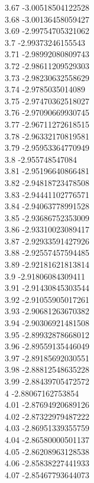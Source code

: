 {3.67	-3.00518504122528\\
3.68	-3.00136458059427\\
3.69	-2.99754705321062\\
3.7	-2.99373246155543\\
3.71	-2.98992080809743\\
3.72	-2.98611209529303\\
3.73	-2.98230632558629\\
3.74	-2.9785035014089\\
3.75	-2.97470362518027\\
3.76	-2.97090669930745\\
3.77	-2.96711272618515\\
3.78	-2.96332170819581\\
3.79	-2.95953364770949\\
3.8	-2.955748547084\\
3.81	-2.95196640866481\\
3.82	-2.94818723478508\\
3.83	-2.94441102776571\\
3.84	-2.94063778991528\\
3.85	-2.93686752353009\\
3.86	-2.93310023089417\\
3.87	-2.92933591427926\\
3.88	-2.92557457594485\\
3.89	-2.92181621813814\\
3.9	-2.91806084309411\\
3.91	-2.91430845303544\\
3.92	-2.91055905017261\\
3.93	-2.90681263670382\\
3.94	-2.90306921481508\\
3.95	-2.89932878668012\\
3.96	-2.89559135446049\\
3.97	-2.89185692030551\\
3.98	-2.88812548635228\\
3.99	-2.88439705472572\\
4	-2.88067162753854\\
4.01	-2.87694920689126\\
4.02	-2.87322979487222\\
4.03	-2.86951339355759\\
4.04	-2.86580000501137\\
4.05	-2.86208963128538\\
4.06	-2.85838227441933\\
4.07	-2.85467793644073\\
}
